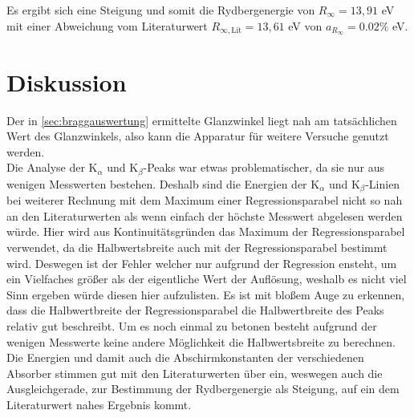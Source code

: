 \documentclass[titlepage = firstcover]{scrartcl}
\begin{document}
        Es ergibt sich eine Steigung und somit die Rydbergenergie von $R_{\infty} = 13,91$ eV mit einer Abweichung vom Literaturwert $R_{\infty,\text{Lit}} = 13,61$ eV von $a_{R_\infty} = 0.02 \%$ eV.

    \section{Diskussion}
      Der in  \autoref{sec:braggauswertung} ermittelte Glanzwinkel liegt nah am tatsächlichen Wert des Glanzwinkels, also kann die Apparatur für weitere Versuche genutzt werden.\\

      Die Analyse der $\text{K}_{\alpha}$ und $\text{K}_{\beta}$-Peaks war etwas problematischer, da sie nur aus wenigen Messwerten bestehen. Deshalb sind die Energien der $\text{K}_{\alpha}$ und $\text{K}_{\beta}$-Linien bei weiterer Rechnung mit dem Maximum einer Regressionsparabel nicht so nah an den Literaturwerten als wenn einfach der höchste Messwert abgelesen werden würde. Hier wird aus Kontinuitätsgründen das Maximum der Regressionsparabel verwendet, da die Halbwertsbreite auch mit der Regressionsparabel bestimmt wird. Deswegen ist der Fehler welcher nur aufgrund der Regression ensteht, um ein Vielfaches größer als der eigentliche Wert der Auflösung, weshalb es nicht viel Sinn ergeben würde diesen hier aufzulisten. Es ist mit bloßem Auge zu erkennen, dass die Halbwertbreite der Regressionsparabel die Halbwertbreite des Peaks relativ gut beschreibt. Um es noch einmal zu betonen besteht aufgrund der wenigen Messwerte keine andere Möglichkeit die Halbwertsbreite zu berechnen.\\

      Die Energien und damit auch die Abschirmkonstanten der verschiedenen Absorber stimmen gut mit den Literaturwerten über ein, weswegen auch die Ausgleichgerade, zur Bestimmung der Rydbergenergie als Steigung, auf ein dem Literaturwert nahes Ergebnis kommt.
      
\end{document}
